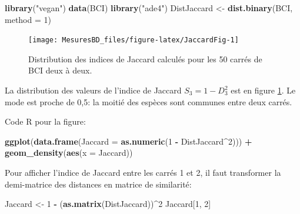 \documentclass[
  11pt,
  french,
  a4paper,
  extrafontsizes,onecolumn,openright
  ]{memoir}
\newenvironment{Shaded}{\begin{snugshade}}{\end{snugshade}}
\newcommand{\AttributeTok}[1]{\textcolor[rgb]{0.13,0.29,0.53}{#1}}
\newcommand{\DecValTok}[1]{\textcolor[rgb]{0.00,0.00,0.81}{#1}}
\newcommand{\FunctionTok}[1]{\textcolor[rgb]{0.13,0.29,0.53}{\textbf{#1}}}
\newcommand{\NormalTok}[1]{#1}
\newcommand{\OtherTok}[1]{\textcolor[rgb]{0.56,0.35,0.01}{#1}}
\newcommand{\SpecialCharTok}[1]{\textcolor[rgb]{0.81,0.36,0.00}{\textbf{#1}}}
\newcommand{\StringTok}[1]{\textcolor[rgb]{0.31,0.60,0.02}{#1}}
\begin{document}
\scriptsize

\begin{Shaded}
\begin{Highlighting}[]
\FunctionTok{library}\NormalTok{(}\StringTok{"vegan"}\NormalTok{)}
\FunctionTok{data}\NormalTok{(BCI)}
\FunctionTok{library}\NormalTok{(}\StringTok{"ade4"}\NormalTok{)}
\NormalTok{DistJaccard }\OtherTok{\textless{}{-}} \FunctionTok{dist.binary}\NormalTok{(BCI, }\AttributeTok{method =} \DecValTok{1}\NormalTok{)}
\end{Highlighting}
\end{Shaded}

\normalsize



\scriptsize

\begin{figure}

{\centering \texttt{[image: MesuresBD\_files/figure-latex/JaccardFig-1]} 

}

\caption{Distribution des indices de Jaccard calculés pour les 50 carrés de BCI deux à deux.}\label{fig:JaccardFig}
\end{figure}

\normalsize

La distribution des valeurs de l'indice de Jaccard \(S_3=1-D_3^2\) est en figure \ref{fig:JaccardFig}.
Le mode est proche de 0,5: la moitié des espèces sont communes entre deux carrés.

Code R pour la figure:

\scriptsize

\begin{Shaded}
\begin{Highlighting}[]
\FunctionTok{ggplot}\NormalTok{(}\FunctionTok{data.frame}\NormalTok{(}\AttributeTok{Jaccard =} \FunctionTok{as.numeric}\NormalTok{(}\DecValTok{1} \SpecialCharTok{{-}}\NormalTok{ DistJaccard}\SpecialCharTok{\^{}}\DecValTok{2}\NormalTok{))) }\SpecialCharTok{+}
    \FunctionTok{geom\_density}\NormalTok{(}\FunctionTok{aes}\NormalTok{(}\AttributeTok{x =}\NormalTok{ Jaccard))}
\end{Highlighting}
\end{Shaded}

\normalsize

Pour afficher l'indice de Jaccard entre les carrés 1 et 2, il faut transformer la demi-matrice des distances en matrice de similarité:

\scriptsize

\begin{Shaded}
\begin{Highlighting}[]
\NormalTok{Jaccard }\OtherTok{\textless{}{-}} \DecValTok{1} \SpecialCharTok{{-}}\NormalTok{ (}\FunctionTok{as.matrix}\NormalTok{(DistJaccard))}\SpecialCharTok{\^{}}\DecValTok{2}
\NormalTok{Jaccard[}\DecValTok{1}\NormalTok{, }\DecValTok{2}\NormalTok{]}
\end{Highlighting}
\end{Shaded}
\end{document}

